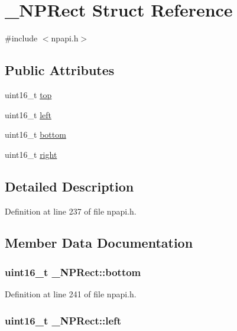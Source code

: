 \hypertarget{struct___n_p_rect}{
\section{\_\-NPRect Struct Reference}
\label{struct___n_p_rect}
}


{\ttfamily \#include $<$npapi.h$>$}

\subsection*{Public Attributes}
\begin{DoxyCompactItemize}
\item 
uint16\_\-t \hyperlink{struct___n_p_rect_af26bc130dfcbdf146f088c83a3d086d9}{top}
\item 
uint16\_\-t \hyperlink{struct___n_p_rect_a1826abedd1c293aa024e4076bc82594a}{left}
\item 
uint16\_\-t \hyperlink{struct___n_p_rect_a57f8ab1e02699596e144c491682222fc}{bottom}
\item 
uint16\_\-t \hyperlink{struct___n_p_rect_aef857a950aa142671e4b70a0376cd521}{right}
\end{DoxyCompactItemize}


\subsection{Detailed Description}


Definition at line 237 of file npapi.h.



\subsection{Member Data Documentation}
\hypertarget{struct___n_p_rect_a57f8ab1e02699596e144c491682222fc}{
\subsubsection[{bottom}]{\setlength{\rightskip}{0pt plus 5cm}uint16\_\-t {\bf \_\-NPRect::bottom}}}
\label{struct___n_p_rect_a57f8ab1e02699596e144c491682222fc}


Definition at line 241 of file npapi.h.

\hypertarget{struct___n_p_rect_a1826abedd1c293aa024e4076bc82594a}{
\subsubsection[{left}]{\setlength{\rightskip}{0pt plus 5cm}uint16\_\-t {\bf \_\-NPRect::left}}}
\label{struct___n_p_rect_a1826abedd1c293aa024e4076bc82594a}


